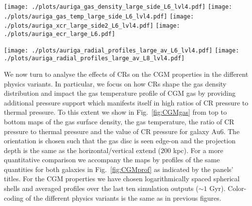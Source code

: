 \documentclass[useAMS,usenatbib]{mnras}
\begin{document}
\begin{figure*}
\begin{center}
\raggedleft
\texttt{[image: ./plots/auriga\_gas\_density\_large\_side\_L6\_lvl4.pdf]}
\texttt{[image: ./plots/auriga\_gas\_temp\_large\_side\_L6\_lvl4.pdf]}
\texttt{[image: ./plots/auriga\_xcr\_large\_side2\_L6\_lvl4.pdf]}
\texttt{[image: ./plots/auriga\_ecr\_large\_L6.pdf]}
\end{center}
\vspace{-.35cm}
\caption{Maps of CGM properties for the four different physics runs of halo Au6 as indicated in each panel. From top to bottom we show the gas surface density, the gas temperature, the CR-to-thermal pressure ratio and the CR pressure. The orientation of each panel is chosen to view the central disc edge-on and the projection depth of each panel is equal to its width, $200$ kpc. Note the smooth gas distribution in the CR runs owing to the additional pressure of the CRs, which however differs considerably for our different variants of CR transport.}
\label{fig:CGMgas}
\end{figure*}


\begin{figure*}
\vspace*{-.3cm}
\begin{center}
\texttt{[image: ./plots/auriga\_radial\_profiles\_large\_av\_L6\_lvl4.pdf]}\vspace{-.15cm}
\texttt{[image: ./plots/auriga\_radial\_profiles\_large\_av\_L8\_lvl4.pdf]}
\end{center}
\vspace{-.35cm}
\caption{Comparison of the radial profiles of the gas density (left), gas temperature (middle panel) and magnetic field strength (right) in the four different physics variants of Au6 (upper panel) and AuL8 (lower panels). The profiles represent time averages over the last 10 simulation outputs ($z\sim0.1$, $t\sim1$ Gyr).}
\label{fig:CGMprof}
\end{figure*}



We now turn to analyse the effects of CRs on the CGM properties in the different physics variants. In particular, we focus on how CRs shape the gas density distribution and impact the gas temperature profile of CGM gas by providing additional pressure support which manifests itself in high ratios of CR pressure to thermal pressure. To this extent we show in Fig.\ \ref{fig:CGMgas} from top to bottom maps of the gas surface density, the gas temperature, the ratio of CR pressure to thermal pressure and the value of CR pressure for galaxy Au6. The orientation is chosen such that the gas disc is seen edge-on and the projection depth is the same as the horizontal/vertical extend ($200$ kpc). For a more quantitative comparison we accompany the maps by profiles of the same quantities for both galaxies in Fig.\ \ref{fig:CGMprof} as indicated by the panels' titles. For the CGM properties we have chosen logarithmically spaced spherical shells and averaged profiles over the last ten simulation outputs ($\sim1$ Gyr). Color-coding of the different physics variants is the same as in previous figures.
\end{document}
